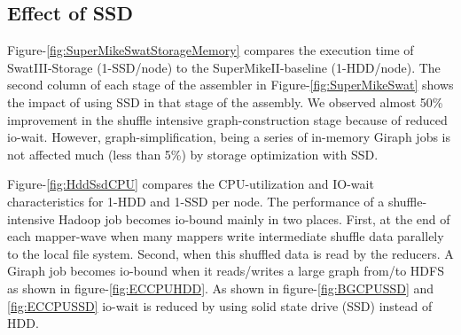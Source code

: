 \documentclass[conference]{IEEEtran}
\begin{document}
\subsection {Effect of SSD} \label{EffectOfSSD}
Figure-\ref{fig:SuperMikeSwatStorageMemory} compares the execution time of SwatIII-Storage (1-SSD/node) to the SuperMikeII-baseline (1-HDD/node).
The second column of each stage of the assembler in Figure-\ref{fig:SuperMikeSwat} shows the impact of using SSD in that stage of the assembly.
We observed almost 50\% improvement in the shuffle intensive graph-construction stage because of reduced io-wait. 
However, graph-simplification, being a series of in-memory Giraph jobs is not affected much (less than 5\%) by storage optimization with SSD. 

Figure-\ref{fig:HddSsdCPU} compares the CPU-utilization and IO-wait characteristics for 1-HDD and 1-SSD per node.
The performance of a shuffle-intensive Hadoop job becomes io-bound mainly in two places. First, at the end of each mapper-wave when many mappers write intermediate shuffle data parallely to the local file system. Second, when this shuffled data is read by the reducers.
A Giraph job becomes io-bound when it reads/writes a large graph from/to HDFS as shown in figure-\ref{fig:ECCPUHDD}.
As shown in figure-\ref{fig:BGCPUSSD} and \ref{fig:ECCPUSSD} io-wait is reduced by using solid state drive (SSD) instead of HDD. 
\end{document}
